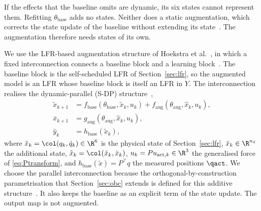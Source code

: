 If the effects that the baseline omits are dynamic, its six states cannot
represent them.
Refitting $\theta_{\mathrm{base}}$ adds no states.
Neither does a static augmentation, which corrects the state update of the
baseline without extending its state~\cite[Sec.~2]{hoekstra2025lfr}.
The augmentation therefore needs states of its own.

We use the LFR-based augmentation structure of Hoekstra et
al.~\cite{hoekstra2025lfr,hoekstra2026lfr}, in which a fixed interconnection
connects a baseline block and a learning
block~\cite[Sec.~3.2]{hoekstra2025lfr}.
The baseline block is the self-scheduled LFR of Section~\ref{sec:lfr}, so the
augmented model is an LFR whose baseline block is itself an LFR in $Y$.
The interconnection realises the dynamic-parallel (S-DP)
structure~\cite[Table~1]{hoekstra2026lfr},
\begin{equation}
\begin{aligned}
 \tilde x_{k+1}
 &=f_{\mathrm{base}}(\theta_{\mathrm{base}},\tilde x_k,u_k)
   +f_{\mathrm{aug}}(\theta_{\mathrm{aug}},\hat x_k,u_k),\\
 \bar x_{k+1}
 &=g_{\mathrm{aug}}(\theta_{\mathrm{aug}},\hat x_k,u_k),\\
 \hat y_k&=h_{\mathrm{base}}(\tilde x_k),
\end{aligned}
\label{eq:aug_transition}
\end{equation}
where $\tilde x_k=\col(q_k,\dot q_k)\in\R^6$ is the physical state of
Section~\ref{sec:lfr}, $\bar x_k\in\R^{n_{\bar x}}$ the additional state,
$\hat x_k=\col(\tilde x_k,\bar x_k)$, $u_k=Pu_{\mathrm{act},k}\in\R^3$ the generalised
force of \eqref{eq:Ptransform}, and $h_{\mathrm{base}}(\tilde x)=P^\top q$ the
measured positions $\qact$.
We choose the parallel interconnection because the orthogonal-by-construction
parametrisation that Section~\ref{sec:obc} extends is defined for this
additive structure~\cite{gyorok2026obc}.
It also keeps the baseline as an explicit term of the state update.
The output map is not augmented.

